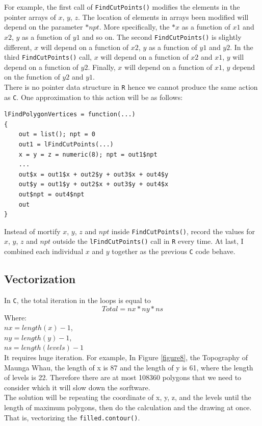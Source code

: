 \documentclass[paper=a4, fontsize=11pt]{report}
\begin{document}
For example, the first call of \texttt{FindCutPoints()} modifies the elements in the pointer arrays of $x$, $y$, $z$. The location of elements in arrays been modified will depend on the parameter $*npt$. More specifically, the $*x$ as a function of $x1$ and $x2$, $y$ as a function of $y1$ and so on. The second \texttt{FindCutPoints()} is slightly different, $x$ will depend on a function of $x2$, $y$ as a function of $y1$ and $y2$. In the third \texttt{FindCutPoints()} call, $x$ will depend on a function of $x2$ and $x1$, $y$ will depend on a function of $y2$. Finally, $x$ will depend on a function of $x1$, $y$ depend on the function of $y2$ and $y1$. \\

There is no pointer data structure in \texttt{R} hence we cannot produce the same action as \texttt{C}. One approximation to this action will be as follows:
\begin{lstlisting}
lFindPolygonVertices = function(...)
{
    out = list(); npt = 0
    out1 = lFindCutPoints(...)
    x = y = z = numeric(8); npt = out1$npt
    ...
    out$x = out1$x + out2$y + out3$x + out4$y
    out$y = out1$y + out2$x + out3$y + out4$x
    out$npt = out4$npt
    out
}
\end{lstlisting}
Instead of mortify $x$, $y$, $z$ and $npt$ inside \texttt{FindCutPoints()}, record the values for $x$, $y$, $z$ and $npt$ outside the \texttt{lFindCutPoints()} call in \texttt{R} every time. At last, I combined each individual $x$ and $y$ together as the previous \texttt{C} code behave. 


\subsection{Vectorization}
In \texttt{C}, the total iteration in the loops is equal to
\begin{equation}
Total = nx * ny * ns
\end{equation}
Where:\\
$nx = length(x) - 1$,\\
$ny = length(y) - 1$,\\
$ns = length(levels) - 1$\\
It requires huge iteration. For example, In Figure \ref{figure8}, the Topography of Maunga Whau, the length of x is 87 and the length of y is 61, where the length of levels is 22. Therefore there are at most 108360 polygons that we need to consider which it will slow down the sorftware. \\
The solution will be repeating the coordinate of x, y, z, and the levels until the length of maximum polygons, then do the calculation and the drawing at once. That is, vectorizing the \texttt{filled.contour()}.\\
\end{document}
